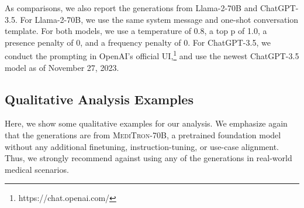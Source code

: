 \documentclass{article}
\newcommand{\llama}{\textnormal{Llama}}
\newcommand{\mtronb}{\textsc{MediTron-70B}\xspace}
\begin{document}
As comparisons, we also report the generations from \llama-2-70B and ChatGPT-3.5. For \llama-2-70B, we use the same system message and one-shot conversation template. For both models, we use a temperature of 0.8, a top p of 1.0, a presence penalty of 0, and a frequency penalty of 0. For ChatGPT-3.5, we conduct the prompting in OpenAI's official UI,\footnote{https://chat.openai.com/} and use the newest ChatGPT-3.5 model as of November 27, 2023.

\subsection{Qualitative Analysis Examples}
Here, we show some qualitative examples for our analysis. We emphasize again that the generations are from \mtronb, a pretrained foundation model without any additional finetuning, instruction-tuning, or use-case alignment. Thus, we strongly recommend against using any of the generations in real-world medical scenarios.
\end{document}
